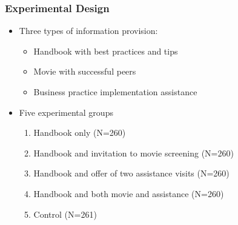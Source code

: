 \documentclass[10pt]{beamer}
\begin{document}
\begin{frame}
\frametitle{Experimental Design}
	\begin{itemize}
	\item Three types of information provision:
	\vspace{0.05in}
		\begin{itemize}
		\item \textcolor[rgb]{0.00,0.07,1.00}{Handbook} with best practices and tips
		\vspace{0.05in}
		\item \textcolor[rgb]{0.00,0.07,1.00}{Movie} with successful peers
		\vspace{0.05in}
		\item Business practice implementation \textcolor[rgb]{0.00,0.07,1.00}{assistance}
		\end{itemize}
	\vspace{0.05in}
\end{itemize}
	\begin{itemize}
\item{Five experimental groups}
	\vspace{0.05in}
            \begin{enumerate}
              \item \textcolor[rgb]{0.00,0.07,1.00}{Handbook} only (N=260)
              \item \textcolor[rgb]{0.00,0.07,1.00}{Handbook} and invitation to \textcolor[rgb]{0.00,0.07,1.00}{movie} screening (N=260)
              \item \textcolor[rgb]{0.00,0.07,1.00}{Handbook} and offer of two \textcolor[rgb]{0.00,0.07,1.00}{assistance} visits (N=260)
              \item \textcolor[rgb]{0.00,0.07,1.00}{Handbook} and both \textcolor[rgb]{0.00,0.07,1.00}{movie} and \textcolor[rgb]{0.00,0.07,1.00}{assistance} (N=260)
              \item Control (N=261)
            \end{enumerate}
        \end{itemize}
\end{frame}
\end{document}
